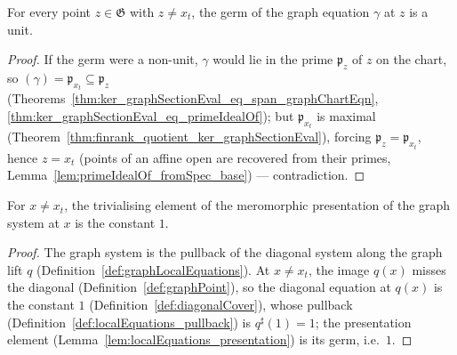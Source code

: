 \begin{lemma}
  \label{lem:isUnit_germ_graphChartEqn_of_ne}
  \leanok
  For every point \(z \in \mathfrak G\) with \(z \neq x_t\), the germ of the graph equation
  \(\gamma\) at \(z\) is a unit.
\end{lemma}
\begin{proof}
  \leanok
  If the germ were a non-unit, \(\gamma\) would lie in the prime \(\mathfrak p_z\) of \(z\)
  on the chart, so \((\gamma) = \mathfrak p_{x_t} \subseteq \mathfrak p_z\)
  (Theorems~\ref{thm:ker_graphSectionEval_eq_span_graphChartEqn},
  \ref{thm:ker_graphSectionEval_eq_primeIdealOf}); but \(\mathfrak p_{x_t}\) is maximal
  (Theorem~\ref{thm:finrank_quotient_ker_graphSectionEval}), forcing
  \(\mathfrak p_z = \mathfrak p_{x_t}\), hence \(z = x_t\) (points of an affine open are
  recovered from their primes, Lemma~\ref{lem:primeIdealOf_fromSpec_base}) — contradiction.
\end{proof}

\begin{lemma}
  \label{lem:presentationElem_graphLocalEquations_of_ne}
  \leanok
  For \(x \neq x_t\), the trivialising element of the meromorphic presentation of the graph
  system at \(x\) is the constant \(1\).
\end{lemma}
\begin{proof}
  \leanok
  The graph system is the pullback of the diagonal system along the graph lift \(q\)
  (Definition~\ref{def:graphLocalEquations}). At \(x \neq x_t\), the image \(q(x)\) misses
  the diagonal (Definition~\ref{def:graphPoint}), so the diagonal equation at \(q(x)\) is
  the constant \(1\) (Definition~\ref{def:diagonalCover}), whose pullback
  (Definition~\ref{def:localEquations_pullback}) is \(q^{\sharp}(1) = 1\); the presentation
  element (Lemma~\ref{lem:localEquations_presentation}) is its germ, i.e.\ \(1\).
\end{proof}

